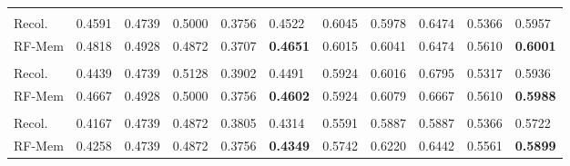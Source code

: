 \begin{table}[h]
\begin{tabular}{p{1.3cm}|M{1.2cm}M{1.2cm}M{1.2cm}M{1.2cm}>{}M{1.1cm}
                            |M{1.2cm}M{1.2cm}M{1.2cm}M{1.2cm}>{}M{1.1cm}}
                 \\
                Recol.
                 & 0.4591 & 0.4739 & 0.5000 & 0.3756 & 0.4522
                 & 0.6045 & 0.5978 & 0.6474 & 0.5366 & 0.5957\\
                
                RF-Mem 
                 & 0.4818 & 0.4928 & 0.4872 & 0.3707 & \textbf{0.4651}
                 & 0.6015 & 0.6041 & 0.6474 & 0.5610 & \textbf{0.6001} \\
                \midrule
                
                 \\
                Recol.
                 & 0.4439 & 0.4739 & 0.5128 & 0.3902 & 0.4491
                 & 0.5924 & 0.6016 & 0.6795 & 0.5317 & 0.5936\\
                
                RF-Mem
                 & 0.4667 & 0.4928 & 0.5000 & 0.3756 & \textbf{0.4602}
                 & 0.5924 & 0.6079 & 0.6667 & 0.5610 & \textbf{0.5988} \\
                \midrule
                
                 \\
                Recol.
                 & 0.4167 & 0.4739 & 0.4872 & 0.3805 & 0.4314 
                 & 0.5591 & 0.5887 & 0.5887 & 0.5366 & 0.5722 \\
                
                RF-Mem
                 & 0.4258 & 0.4739 & 0.4872 & 0.3756 & \textbf{0.4349}
                 & 0.5742 & 0.6220 & 0.6442 & 0.5561 & \textbf{0.5899}\\
        \bottomrule
        \end{tabular}
\vspace{-10pt}
\end{table}

